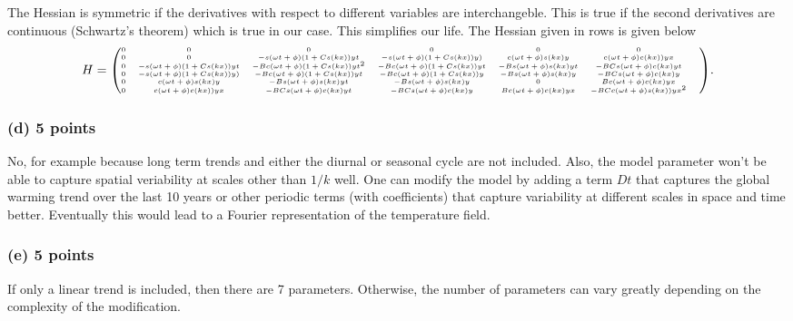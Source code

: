 \documentclass[11pt]{article}
\begin{document}
The Hessian is symmetric if the derivatives with respect to different variables are interchangeble. This is true if the second derivatives are continuous (Schwartz's theorem) which is true in our case. This simplifies our life. The Hessian given in rows is given below
\begin{equation}
\tiny{
        \nonumber H =
\begin{pmatrix} 
0 & 0 & 0 & 0 & 0 & 0\\
0 & 0 & -s(\omega t + \phi)   (1+C s(kx))  yt & -s(\omega t + \phi)   (1+C s(kx))  y) & c(\omega t + \phi)   s(kx)  y & c(\omega t + \phi)   c(kx))  yx\\
0 & -s(\omega t + \phi)   (1+C s(kx))  yt & -Bc(\omega t + \phi)   (1+C s(kx))  yt^2 & -Bc(\omega t + \phi)   (1+C s(kx))  yt & -Bs(\omega t + \phi)   s(kx)  yt & -BCs(\omega t + \phi)   c(kx)  yt & \\
0 & -s(\omega t + \phi)   (1+C s(kx))  y) & -Bc(\omega t + \phi)   (1+C s(kx))  yt & -Bc(\omega t + \phi)   (1+C s(kx))  y & -Bs(\omega t + \phi)   s(kx)  y & -BCs(\omega t + \phi)   c(kx)  y \\
0 & c(\omega t + \phi)   s(kx)  y & -Bs(\omega t + \phi)   s(kx)  yt & -Bs(\omega t + \phi)   s(kx)  y & 0 & B c(\omega t + \phi) c(kx) yx\\
0 & c(\omega t + \phi)   c(kx))  yx & -BCs(\omega t + \phi) c(kx)  yt & -BCs(\omega t + \phi)   c(kx)  y & B c(\omega t + \phi)  c(kx) yx & -BC c(\omega t + \phi) s(kx))   yx^2
\end{pmatrix}}.
\end{equation}

\subsubsection*{(d) 5 points}

No, for example because long term trends and either the diurnal or seasonal cycle are not included. Also, the model parameter won't be able to capture spatial veriability at scales other than $1/k$ well. One can modify the model by adding a term $D t$ that captures the global warming trend over the last 10 years or other periodic terms (with coefficients) that capture variability at different scales in space and time better. Eventually this would lead to a Fourier representation of the temperature field.

\subsubsection*{(e) 5 points}
If only a linear trend is included, then there are 7 parameters. Otherwise, the number of parameters can vary greatly depending on the complexity of the modification.
\end{document}

